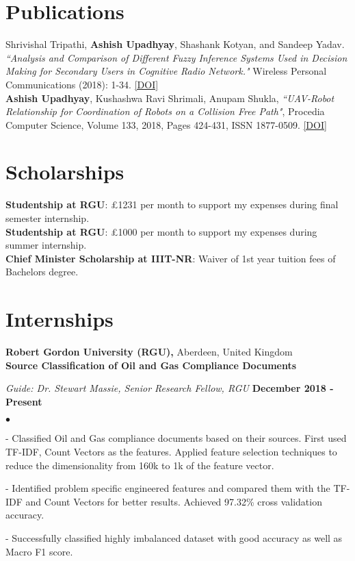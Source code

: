 \documentclass[margin,line]{res}
\newenvironment{list2}{
  \begin{list}{$\bullet$}{%
      \setlength{\itemsep}{0in}
      \setlength{\parsep}{0in} \setlength{\parskip}{0in}
      \setlength{\topsep}{0in} \setlength{\partopsep}{0in} 
      \setlength{\leftmargin}{0.2in}}}{\end{list}}
\begin{document}
\begin{resume}
\section{\sc Publications}
Shrivishal Tripathi, {\bf Ashish Upadhyay}, Shashank Kotyan, and Sandeep Yadav. {\em ``Analysis and Comparison of Different Fuzzy Inference Systems Used in Decision Making for Secondary Users in Cognitive Radio Network."} Wireless Personal Communications (2018): 1-34. \textcolor{blue}{\href{https://doi.org/10.1007/s11277-018-6075-9
}{[DOI]}}
\vspace{.1cm}\\
{\bf Ashish Upadhyay}, Kushashwa Ravi Shrimali, Anupam Shukla,
{\em ``UAV-Robot Relationship for Coordination of Robots on a Collision Free Path"}, Procedia Computer Science, Volume 133, 2018, Pages 424-431, ISSN 1877-0509. \textcolor{blue}{\href{https://doi.org/10.1016/j.procs.2018.07.052}{[DOI]}}

\vspace{-0.1in}
\section{\sc Scholarships}
{\bf Studentship at RGU}: \pounds 1231 per month to support my expenses during final semester internship.\\
{\bf Studentship at RGU}: \pounds 1000 per month to support my expenses during summer internship.\\
{\bf Chief Minister Scholarship at IIIT-NR}: Waiver of 1st year tuition fees of Bachelors degree.


\vspace{-0.1in}
\section{\sc Internships}
{\bf Robert Gordon University (RGU),} Aberdeen, United Kingdom\\
{\bf Source Classification of Oil and Gas Compliance Documents}

\vspace{-.3cm}
{\em Guide: Dr. Stewart Massie, Senior Research Fellow, RGU} \hfill {\bf December 2018 - Present}\\
\vspace*{-.4cm}
\begin{list2}
\item[-] Classified Oil and Gas compliance documents based on their sources. First used TF-IDF, Count Vectors as the features. Applied feature selection techniques to reduce the dimensionality from 160k to 1k of the feature vector.
\item[-] Identified problem specific engineered features and compared them with the TF-IDF and Count Vectors for better results. Achieved 97.32\% cross validation accuracy.
\item[-] Successfully classified highly imbalanced dataset with good accuracy as well as Macro F1 score.
\end{list2}


\end{resume}
\end{document}
